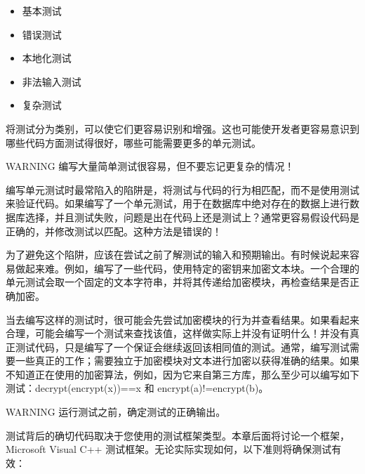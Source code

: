 \begin{itemize}
\item
基本测试

\item
错误测试

\item
本地化测试

\item
非法输入测试

\item
复杂测试
\end{itemize}

将测试分为类别，可以使它们更容易识别和增强。这也可能使开发者更容易意识到哪些代码方面测试得很好，哪些可能需要更多的单元测试。

\begin{myWarning}{WARNING}
编写大量简单测试很容易，但不要忘记更复杂的情况！
\end{myWarning}


编写单元测试时最常陷入的陷阱是，将测试与代码的行为相匹配，而不是使用测试来验证代码。如果编写了一个单元测试，用于在数据库中绝对存在的数据上进行数据库选择，并且测试失败，问题是出在代码上还是测试上？通常更容易假设代码是正确的，并修改测试以匹配。这种方法是错误的！

为了避免这个陷阱，应该在尝试之前了解测试的输入和预期输出。有时候说起来容易做起来难。例如，编写了一些代码，使用特定的密钥来加密文本块。一个合理的单元测试会取一个固定的文本字符串，并将其传递给加密模块，再检查结果是否正确加密。

当去编写这样的测试时，很可能会先尝试加密模块的行为并查看结果。如果看起来合理，可能会编写一个测试来查找该值，这样做实际上并没有证明什么！并没有真正测试代码，只是编写了一个保证会继续返回该相同值的测试。通常，编写测试需要一些真正的工作；需要独立于加密模块对文本进行加密以获得准确的结果。如果不知道正在使用的加密算法，例如，因为它来自第三方库，那么至少可以编写如下测试：decrypt(encrypt(x))==x 和 encrypt(a)!=encrypt(b)。

\begin{myWarning}{WARNING}
运行测试之前，确定测试的正确输出。
\end{myWarning}


测试背后的确切代码取决于您使用的测试框架类型。本章后面将讨论一个框架，Microsoft Visual C++ 测试框架。无论实际实现如何，以下准则将确保测试有效：

